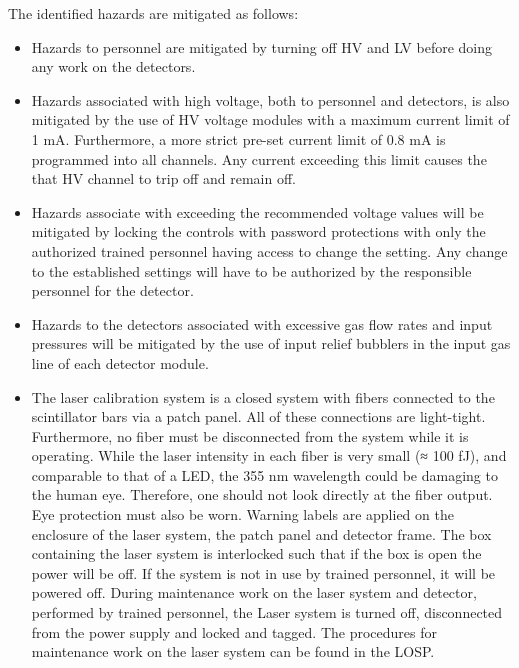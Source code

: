 The identified hazards are mitigated as follows:
\begin{itemize}
\item  Hazards to personnel are mitigated by turning off HV and LV before doing any work on the detectors.
\item Hazards associated with high voltage, both to personnel and detectors, is also mitigated by the use of HV voltage modules with a maximum current limit of 1 mA. Furthermore, a more strict pre-set current limit of 0.8 mA is
programmed into all channels. Any current exceeding this limit causes the that HV channel to trip off and
remain off.
\item Hazards associate with exceeding the recommended voltage values will be mitigated by locking the controls
with password protections with only the authorized trained personnel having access to change the setting. Any
change to the established settings will have to be authorized by the responsible personnel for the detector.
\item Hazards to the detectors associated with excessive gas flow rates and input pressures will be mitigated by the use of input relief bubblers in the input gas line of each detector module.
\item The laser calibration system is a closed system with fibers connected to the
scintillator bars via a patch panel. All of these connections are light-tight.
Furthermore, no fiber must be disconnected from the system while it is
operating. While the laser intensity in each fiber is very small (≈ 100 fJ),
and comparable to that of a LED, the 355 nm wavelength could be damaging to the human eye. Therefore, one should not look directly at the fiber output.  Eye protection must also be worn.
Warning labels are applied on the enclosure of the laser system, the patch
panel and detector frame. The box containing the laser system is interlocked
such that if the box is open the power will be off. If the system is not in
use by trained personnel, it will be powered off. During maintenance work
on the laser system and detector, performed by trained personnel, the Laser
system is turned off, disconnected from the power supply and locked and
tagged. The procedures for maintenance work on the laser system can be
found in the LOSP.
\end{itemize}


